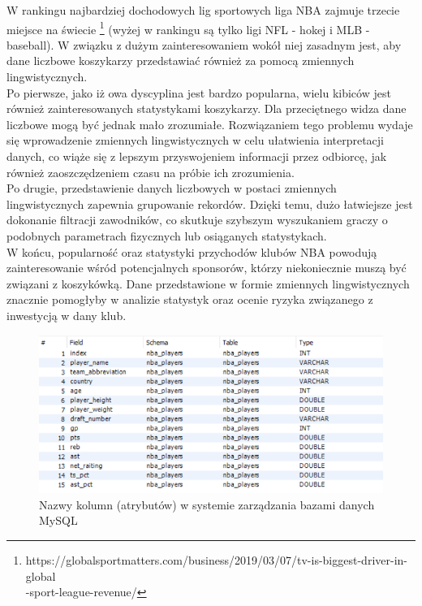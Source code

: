 \documentclass{classrep}
\begin{document}
 W rankingu najbardziej dochodowych lig sportowych liga NBA zajmuje trzecie miejsce na świecie 
 \footnote {https://globalsportmatters.com/business/2019/03/07/tv-is-biggest-driver-in-global\\-sport-league-revenue/}
(wyżej w rankingu są tylko ligi NFL - hokej i MLB - baseball). W związku z dużym zainteresowaniem wokół niej zasadnym jest, aby dane liczbowe koszykarzy przedstawiać również za pomocą zmiennych lingwistycznych. \\
 \indent Po pierwsze, jako iż owa dyscyplina jest bardzo popularna, wielu kibiców jest również zainteresowanych statystykami koszykarzy. Dla przeciętnego widza dane liczbowe mogą być jednak mało zrozumiałe. Rozwiązaniem tego problemu wydaje się wprowadzenie zmiennych lingwistycznych w celu ułatwienia interpretacji danych, co wiąże się z lepszym przyswojeniem informacji przez odbiorcę, jak również zaoszczędzeniem czasu na próbie ich zrozumienia. \\
 \indent Po drugie, przedstawienie danych liczbowych w postaci zmiennych lingwistycznych zapewnia grupowanie rekordów. Dzięki temu, dużo łatwiejsze jest dokonanie filtracji zawodników, co skutkuje szybszym wyszukaniem graczy o podobnych parametrach fizycznych lub osiąganych statystykach.\\
 \indent W końcu, popularność oraz statystyki przychodów klubów NBA powodują zainteresowanie wśród potencjalnych sponsorów, którzy niekoniecznie muszą być związani z koszykówką. Dane przedstawione w formie zmiennych lingwistycznych znacznie pomogłyby w analizie statystyk oraz ocenie ryzyka związanego z inwestycją w dany klub. 
 \begin{figure}[H]
    \centering
    \includegraphics[width=14cm]{mysql_tables.png}
    \caption{Nazwy kolumn (atrybutów) w systemie zarządzania bazami danych MySQL}
    \label{rysunek:baza_danych}
\end{figure}
\end{document}
